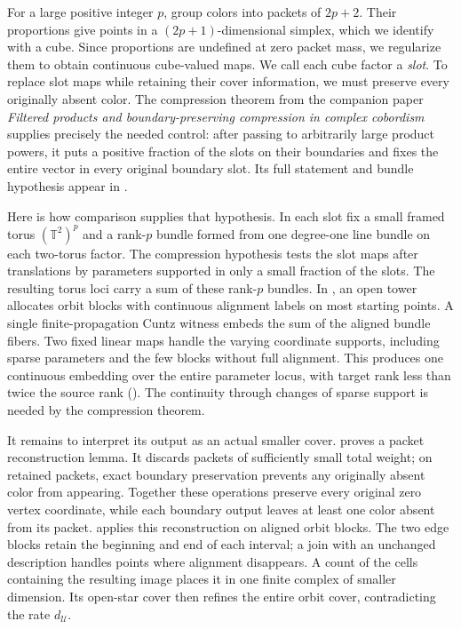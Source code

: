 For a large positive integer $p$, group colors into packets of $2p+2$.
Their proportions give points in a $(2p+1)$-dimensional simplex, which
we identify with a cube. Since proportions are undefined at zero packet
mass, we regularize them to obtain continuous cube-valued maps. We call
each cube factor a \emph{slot}. To replace slot maps while retaining
their cover information, we must preserve every originally absent color. The compression theorem
from the companion paper
\emph{Filtered products and boundary-preserving compression in complex
cobordism} \cite{OpenAICompression2026} supplies precisely the needed
control: after passing to arbitrarily large product powers, it puts a
positive fraction of the slots on their boundaries and fixes the entire
vector in every original boundary slot. Its full statement and bundle
hypothesis appear in .

Here is how comparison supplies that hypothesis. In each slot fix a
small framed torus $(\mathbb T^2)^p$ and a rank-$p$ bundle formed from
one degree-one line bundle on each two-torus factor. The compression
hypothesis tests the slot maps after translations by
parameters supported in only a small fraction of the slots. The resulting
torus loci carry a sum of these rank-$p$ bundles.
In , an open tower allocates orbit blocks
with continuous alignment labels on most starting points. A single
finite-propagation Cuntz witness embeds the sum of the aligned bundle
fibers. Two fixed linear maps handle the varying coordinate supports,
including sparse parameters and the few blocks without full alignment.
This produces one continuous embedding over the entire parameter locus,
with target rank less than twice the source rank
(). The continuity through changes of sparse
support is needed by the compression theorem.

It remains to interpret its output as an actual smaller cover.
 proves a packet reconstruction lemma.
It discards packets of sufficiently small total weight; on retained
packets, exact boundary preservation prevents any originally absent
color from appearing. Together these operations preserve every original
zero vertex coordinate, while each boundary output leaves at least one
color absent from its packet.  applies this
reconstruction on aligned orbit blocks. The two edge blocks retain the beginning and
end of each interval; a join with an unchanged description handles
points where alignment disappears. A count of the cells containing the
resulting image places it in one finite complex of smaller dimension.
Its open-star cover then refines the entire orbit cover, contradicting
the rate $d_{\mathcal U}$.

